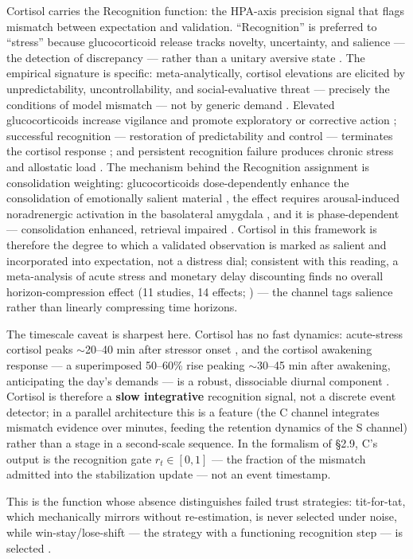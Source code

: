 \documentclass[
]{article}
\begin{document}
Cortisol carries the Recognition function: the HPA-axis precision signal
that flags mismatch between expectation and validation. ``Recognition''
is preferred to ``stress'' because glucocorticoid release tracks
novelty, uncertainty, and salience --- the detection of discrepancy ---
rather than a unitary aversive state . The empirical signature is
specific: meta-analytically, cortisol elevations are elicited by
unpredictability, uncontrollability, and social-evaluative threat ---
precisely the conditions of model mismatch --- not by generic demand .
Elevated glucocorticoids increase vigilance and promote exploratory or
corrective action ; successful recognition --- restoration of
predictability and control --- terminates the cortisol response ; and
persistent recognition failure produces chronic stress and allostatic
load . The mechanism behind the Recognition assignment is consolidation
weighting: glucocorticoids dose-dependently enhance the consolidation of
emotionally salient material , the effect requires arousal-induced
noradrenergic activation in the basolateral amygdala , and it is
phase-dependent --- consolidation enhanced, retrieval impaired .
Cortisol in this framework is therefore the degree to which a validated
observation is marked as salient and incorporated into expectation, not
a distress dial; consistent with this reading, a meta-analysis of acute
stress and monetary delay discounting finds no overall
horizon-compression effect (11 studies, 14 effects; ) --- the channel
tags salience rather than linearly compressing time horizons.

The timescale caveat is sharpest here. Cortisol has no fast dynamics:
acute-stress cortisol peaks \(\sim\)20--40 min after stressor onset ,
and the cortisol awakening response --- a superimposed 50--60\% rise
peaking \(\sim\)30--45 min after awakening, anticipating the day's
demands --- is a robust, dissociable diurnal component . Cortisol is
therefore a \textbf{slow integrative} recognition signal, not a discrete
event detector; in a parallel architecture this is a feature (the C
channel integrates mismatch evidence over minutes, feeding the retention
dynamics of the S channel) rather than a stage in a second-scale
sequence. In the formalism of §2.9, C's output is the recognition gate
\(r_t \in [0,1]\) --- the fraction of the mismatch admitted into the
stabilization update --- not an event timestamp.

This is the function whose absence distinguishes failed trust
strategies: tit-for-tat, which mechanically mirrors without
re-estimation, is never selected under noise, while win-stay/lose-shift
--- the strategy with a functioning recognition step --- is selected .
\end{document}
